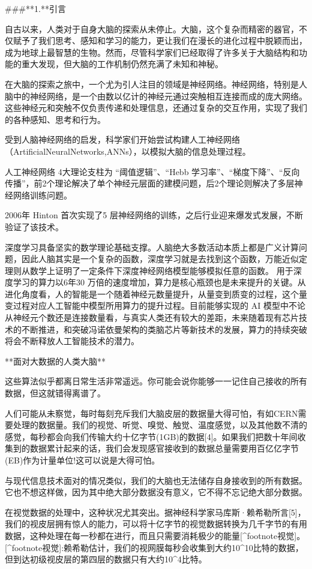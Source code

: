 ###**1.**引言

自古以来，人类对于自身大脑的探索从未停止。大脑，这个复杂而精密的器官，不仅赋予了我们思考、感知和学习的能力，更让我们在漫长的进化过程中脱颖而出，成为地球上最智慧的生物。然而，尽管科学家们已经取得了许多关于大脑结构和功能的重大发现，但大脑的工作机制仍然充满了未知和神秘。

在大脑的探索之旅中，一个尤为引人注目的领域是神经网络。神经网络，特别是人脑中的神经网络，是一个由数以亿计的神经元通过突触相互连接而成的庞大网络。这些神经元和突触不仅负责传递和处理信息，还通过复杂的交互作用，实现了我们的各种感知、思考和行为。

受到人脑神经网络的启发，科学家们开始尝试构建人工神经网络（ArtificialNeuralNetworks,ANNs），以模拟大脑的信息处理过程。

人工神经网络 4大理论支柱为 “阈值逻辑”、“Hebb 学习率”、“梯度下降”、“反向传播”，前2个理论解决了单个神经元层面的建模问题，后2个理论则解决了多层神经网络训练问题。

2006年 Hinton 首次实现了5 层神经网络的训练，之后行业迎来爆发式发展，不断验证了该技术。

深度学习具备坚实的数学理论基础支撑。人脑绝大多数活动本质上都是广义计算问题，因此人脑其实是一个复杂的函数，深度学习就是去找到这个函数，万能近似定理则从数学上证明了一定条件下深度神经网络模型能够模拟任意的函数。
用于深度学习的算力以6年30 万倍的速度增加，算力是核心瓶颈也是未来提升的关键。从进化角度看，人的智能是一个随着神经元数量提升，从量变到质变的过程，这个量变过程对应人工智能中模型所用算力的提升过程。目前能够实现的 AI 模型中不论从神经元个数还是连接数量看，与真实人类还有较大的差距，未来随着现有芯片技术的不断推进，和突破冯诺依曼架构的类脑芯片等新技术的发展，算力的持续突破将会不断释放人工智能技术的潜力。


**面对大数据的人类大脑**

这些算法似乎都离日常生活非常遥远。你可能会说你能够一一记住自己接收的所有数据，但这就错得离谱了。

人们可能从未察觉，每时每刻充斥我们大脑皮层的数据量大得可怕，有如CERN需要处理的数据量。我们的视觉、听觉、嗅觉、触觉、温度感觉，以及其他数不清的感觉，每秒都会向我们传输大约十亿字节(1GB)的数据[4]。如果我们把数十年间收集到的数据累计起来的话，我们会发现感官接收到的数据总量需要用百亿亿字节(EB)作为计量单位!这可以说是大得可怕。

与现代信息技术面对的情况类似，我们的大脑也无法储存自身接收到的所有数据。它也不想这样做，因为其中绝大部分数据没有意义，它不得不忘记绝大部分数据。

在视觉数据的处理中，这种状况尤其突出。据神经科学家马库斯·赖希勒所言[5]，我们的视皮层拥有惊人的能力，可以将十亿字节的视觉数据转换为几千字节的有用数据，这种处理在每一秒都在进行，而且只需要消耗极少的能量[^footnote视觉]。
[^footnote视觉]:赖希勒估计，我们的视网膜每秒会收集到大约10^10比特的数据，但到达初级视皮层的第四层的数据只有大约10^4比特。


